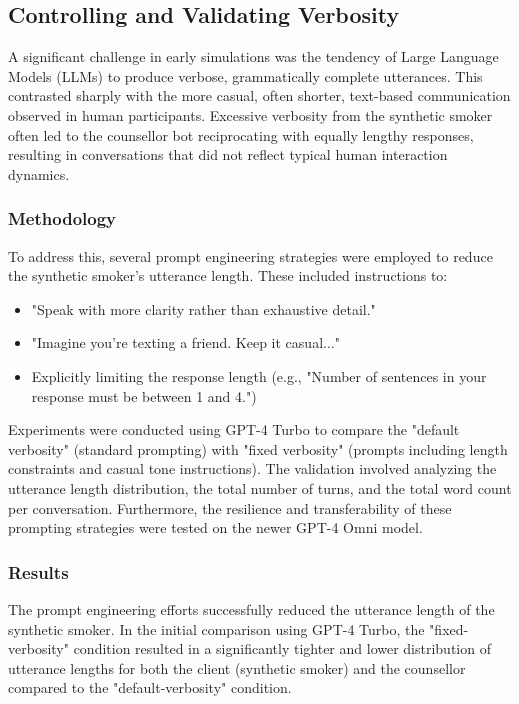 \subsection{Controlling and Validating Verbosity}

A significant challenge in early simulations was the tendency of Large Language Models (LLMs) to produce verbose, grammatically complete utterances. This contrasted sharply with the more casual, often shorter, text-based communication observed in human participants. Excessive verbosity from the synthetic smoker often led to the counsellor bot reciprocating with equally lengthy responses, resulting in conversations that did not reflect typical human interaction dynamics.

\subsubsection{Methodology}

To address this, several prompt engineering strategies were employed to reduce the synthetic smoker's utterance length. These included instructions to:
\begin{itemize}
    \item "Speak with more clarity rather than exhaustive detail."
    \item "Imagine you're texting a friend. Keep it casual..."
    \item Explicitly limiting the response length (e.g., "Number of sentences in your response must be between 1 and 4.")
\end{itemize}
Experiments were conducted using GPT-4 Turbo to compare the "default verbosity" (standard prompting) with "fixed verbosity" (prompts including length constraints and casual tone instructions). The validation involved analyzing the utterance length distribution, the total number of turns, and the total word count per conversation. Furthermore, the resilience and transferability of these prompting strategies were tested on the newer GPT-4 Omni model.

\subsubsection{Results}

The prompt engineering efforts successfully reduced the utterance length of the synthetic smoker. In the initial comparison using GPT-4 Turbo, the "fixed-verbosity" condition resulted in a significantly tighter and lower distribution of utterance lengths for both the client (synthetic smoker) and the counsellor compared to the "default-verbosity" condition.

